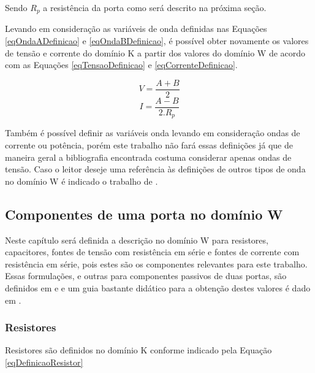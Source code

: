 	Sendo $R_p$ a resistência da porta como será descrito na próxima seção.
	
	Levando em consideração as variáveis de onda definidas nas Equações \ref{eqOndaADefinicao} e \ref{eqOndaBDefinicao}, é possível obter novamente os valores de tensão e corrente do domínio K a partir dos valores do domínio W de acordo com as Equações \ref{eqTensaoDefinicao} e \ref{eqCorrenteDefinicao}.
	
	\begin{equation}
		\label{eqTensaoDefinicao}
		V = \frac{A + B}{2}
	\end{equation} 
	\begin{equation}
		\label{eqCorrenteDefinicao}
		I = \frac{A - B }{2 . R_p}
	\end{equation}
	
	Também é possível definir as variáveis onda levando em consideração ondas de corrente ou potência, porém este trabalho não fará essas definições já que de maneira geral a bibliografia encontrada costuma considerar apenas ondas de tensão. Caso o leitor deseje uma referência às definições de outros tipos de onda no domínio W é indicado o trabalho de . 
	
	\subsection{Componentes de uma porta no domínio W}
	Neste capítulo será definida a descrição no domínio W para resistores, capacitores, fontes de tensão com resistência em série e fontes de corrente com resistência em série, pois estes são os componentes relevantes para este trabalho. Essas formulações, e outras para componentes passivos de duas portas, são definidos em  e  e um guia bastante didático para a obtenção destes valores é dado em .
	 
		\subsubsection{Resistores}
	
	Resistores são definidos no domínio K conforme indicado pela Equação \ref{eqDefinicaoResistor}
	
